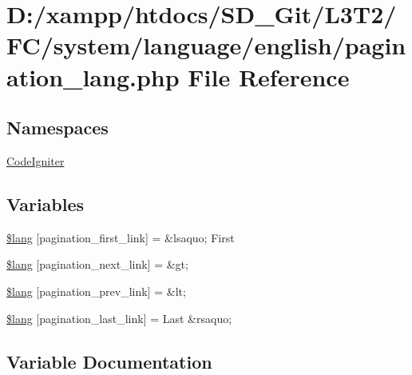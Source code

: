 \hypertarget{system_2language_2english_2pagination__lang_8php}{}\section{D\+:/xampp/htdocs/\+S\+D\+\_\+\+Git/\+L3\+T2/\+F\+C/system/language/english/pagination\+\_\+lang.php File Reference}
\label{system_2language_2english_2pagination__lang_8php}
\subsection*{Namespaces}
\begin{DoxyCompactItemize}
\item 
 \hyperlink{namespace_code_igniter}{Code\+Igniter}
\end{DoxyCompactItemize}
\subsection*{Variables}
\begin{DoxyCompactItemize}
\item 
\hyperlink{system_2language_2english_2pagination__lang_8php_a9786c3ca317374647c440f713c686d49}{\$lang} \mbox{[}\textquotesingle{}pagination\+\_\+first\+\_\+link\textquotesingle{}\mbox{]} = \textquotesingle{}\&lsaquo; First\textquotesingle{}
\item 
\hyperlink{system_2language_2english_2pagination__lang_8php_a485f808a96ff78250ab760d638f3ddc7}{\$lang} \mbox{[}\textquotesingle{}pagination\+\_\+next\+\_\+link\textquotesingle{}\mbox{]} = \textquotesingle{}\&gt;\textquotesingle{}
\item 
\hyperlink{system_2language_2english_2pagination__lang_8php_a5388708db9e549b8ec5ec4cd49073c84}{\$lang} \mbox{[}\textquotesingle{}pagination\+\_\+prev\+\_\+link\textquotesingle{}\mbox{]} = \textquotesingle{}\&lt;\textquotesingle{}
\item 
\hyperlink{system_2language_2english_2pagination__lang_8php_aa4f66cf3f9c7c4b479f01776761faea6}{\$lang} \mbox{[}\textquotesingle{}pagination\+\_\+last\+\_\+link\textquotesingle{}\mbox{]} = \textquotesingle{}Last \&rsaquo;\textquotesingle{}
\end{DoxyCompactItemize}


\subsection{Variable Documentation}
\hypertarget{system_2language_2english_2pagination__lang_8php_a9786c3ca317374647c440f713c686d49}{}
